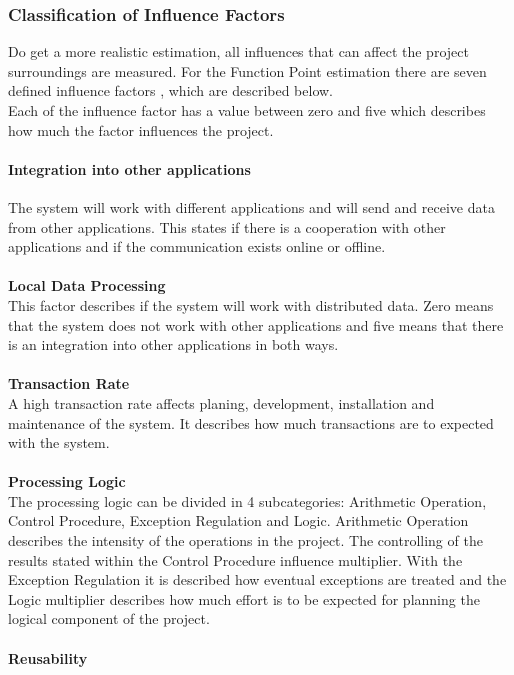 \subsubsection{ Classification of Influence Factors}

Do get a more realistic estimation, all influences that can affect the project surroundings are measured. For the Function Point estimation there are seven defined influence factors \cite{Softwaremanagement}, which are described below.\\
Each of the influence factor has a value between zero and five which describes how much the factor influences the project.\\
\paragraph{Integration into other applications}
The system will work with different applications and will send and receive data from other applications. This states if there is a cooperation with other applications and if the communication exists online or offline. 
\\
\\
\textbf{Local Data Processing}\\
This factor describes if the system will work with distributed data. Zero means that the system does not work with other applications and five means that there is an integration into other applications in both ways.\\
\\
\textbf{Transaction Rate}\\
A high transaction rate affects planing, development, installation and maintenance of the system. It describes how much transactions are to expected with the system.\\
\\
\textbf{Processing Logic}\\
The processing logic can be divided in 4 subcategories: Arithmetic Operation, Control Procedure, Exception Regulation and Logic. Arithmetic Operation describes the intensity of the operations in the project. The controlling of the results stated within the Control Procedure influence multiplier. With the Exception Regulation it is described how eventual exceptions are treated and the Logic multiplier describes how much effort is to be expected for planning the logical component of the project.\\
\\
\textbf{Reusability}\\
